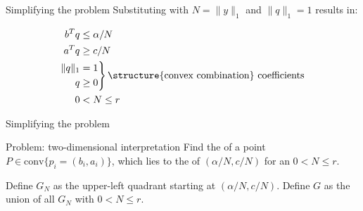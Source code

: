 \begin{frame}{Simplifying the problem}
Substituting  with $N=\|y\|_1$ and $\|q\|_1=1$ results in:

\begin{equation*}
 \begin{split}
  b^T q&\leq \alpha/N\\
  a^T q&\geq c/N\\
  \begin{aligned}
   \|q\|_1\\
   q
  \end{aligned}
  &
  \begin{rcases*}
   =1\\
   \geq 0
  \end{rcases*} \text{\structure{convex combination} coefficients}  \\
  0&<N\leq r
 \end{split}
\end{equation*}
\end{frame}

\begin{frame}{Simplifying the problem}
\begin{block}{Problem: two-dimensional interpretation}
Find the  of a point $P\in\mathrm{conv}\{p_i=(b_i,a_i)\}$, which lies to the  of $(\alpha/N, c/N)$ for an $0<N\leq r$.
\end{block}

\vspace{1cm}

Define $G_N$ as the upper-left quadrant starting at $(\alpha/N, c/N)$.
Define $G$ as the union of all $G_N$ with $0<N\leq r$.

\end{frame}

